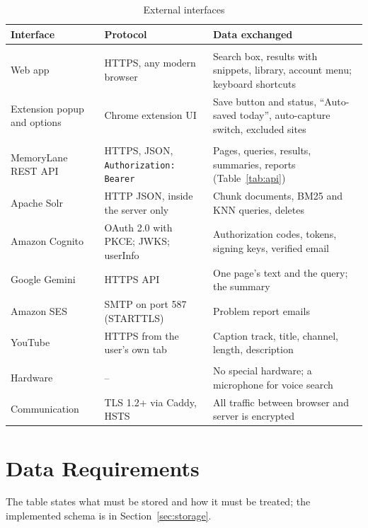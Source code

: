 \begin{table}[H]
\centering
\footnotesize
\begin{tabularx}{\textwidth}{>{\raggedright\arraybackslash}p{} >{\raggedright\arraybackslash}p{} L}
\toprule
\textbf{Interface} & \textbf{Protocol} & \textbf{Data exchanged} \\
\midrule
{} \\
Web app & HTTPS, any modern browser & Search box, results with snippets, library, account menu; keyboard shortcuts \\
Extension popup and options & Chrome extension UI & Save button and status, ``Auto-saved today'', auto-capture switch, excluded sites \\
 \\
MemoryLane REST API & HTTPS, JSON, \texttt{Authorization: Bearer} & Pages, queries, results, summaries, reports (Table~\ref{tab:api}) \\
Apache Solr & HTTP JSON, inside the server only & Chunk documents, BM25 and KNN queries, deletes \\
Amazon Cognito & OAuth 2.0 with PKCE; JWKS; userInfo & Authorization codes, tokens, signing keys, verified email \\
Google Gemini & HTTPS API & One page's text and the query; the summary \\
Amazon SES & SMTP on port 587 (STARTTLS) & Problem report emails \\
YouTube & HTTPS from the user's own tab & Caption track, title, channel, length, description \\
 \\
Hardware & -- & No special hardware; a microphone for voice search \\
Communication & TLS 1.2+ via Caddy, HSTS & All traffic between browser and server is encrypted \\
\bottomrule
\end{tabularx}
\caption{External interfaces}
\label{tab:interfaces}
\end{table}

\section{Data Requirements}

The table states what must be stored and how it must be treated; the
implemented schema is in Section~\ref{sec:storage}.

